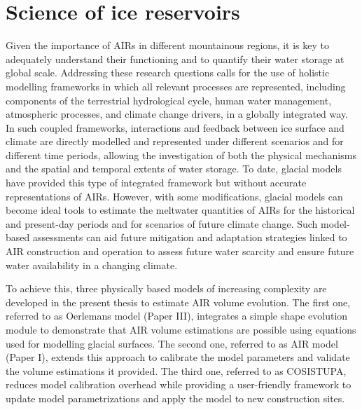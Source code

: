 \chapter{Science of ice reservoirs}
\label{chap:science}


Given the importance of \ac{AIRs} in different mountainous regions, it is key to adequately understand their
functioning and to quantify their water storage at global scale. Addressing these research questions
calls for the use of holistic modelling frameworks in which all relevant processes are represented, including
components of the terrestrial hydrological cycle, human water management, atmospheric processes, and climate
change drivers, in a globally integrated way. In such coupled frameworks, interactions and feedback between
ice surface and climate are directly modelled and represented under different scenarios and for different time
periods, allowing the investigation of both the physical mechanisms and the spatial and temporal extents of water
storage. To date, glacial models have provided this type of integrated framework but without accurate
representations of \ac{AIRs}. However, with some modifications, glacial models can become ideal tools to estimate the
meltwater quantities of \ac{AIRs} for the historical and present-day periods and for scenarios of future
climate change. Such model-based assessments can aid future mitigation and adaptation strategies linked to AIR
construction and operation to assess future water scarcity and ensure future water availability in a changing
climate.

To achieve this, three physically based models of increasing complexity are developed in the present thesis to estimate
AIR volume evolution. The first one, referred to as Oerlemans model (Paper III), integrates a simple shape
evolution module to demonstrate that AIR volume estimations are possible using equations used for modelling
glacial surfaces. The second one, referred to as AIR model (Paper I), extends this approach to calibrate the
model parameters and validate the volume estimations it provided. The third one, referred to as COSISTUPA,
reduces model calibration overhead while providing a user-friendly framework to update model parametrizations
and apply the model to new construction sites. 

